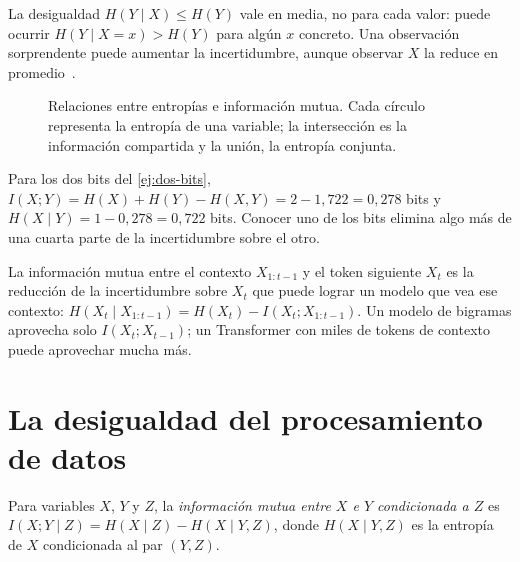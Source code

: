 \begin{observacion}
La desigualdad $H(Y\mid X)\le H(Y)$ vale en media, no para cada valor: puede ocurrir $H(Y\mid X=x)>H(Y)$ para algún $x$ concreto. Una observación sorprendente puede aumentar la incertidumbre, aunque observar $X$ la reduce en promedio~\cite[§2.6]{ct}.
\end{observacion}

\begin{figure}[h]
\centering
{}
\caption{Relaciones entre entropías e información mutua. Cada círculo representa la entropía de una variable; la intersección es la información compartida y la unión, la entropía conjunta.}
\label{fig:venn}
\end{figure}

\begin{ejemplo}\label{ej:mutua-bits}
Para los dos bits del \cref{ej:dos-bits}, $I(X;Y)=H(X)+H(Y)-H(X,Y)=2-1{,}722=0{,}278$ bits y $H(X\mid Y)=1-0{,}278=0{,}722$ bits. Conocer uno de los bits elimina algo más de una cuarta parte de la incertidumbre sobre el otro.
\end{ejemplo}

\begin{observacion}
La información mutua entre el contexto $X_{1:t-1}$ y el token siguiente $X_t$ es la reducción de la incertidumbre sobre $X_t$ que puede lograr un modelo que vea ese contexto: $H(X_t\mid X_{1:t-1})=H(X_t)-I(X_t;X_{1:t-1})$. Un modelo de bigramas aprovecha solo $I(X_t;X_{t-1})$; un Transformer con miles de tokens de contexto puede aprovechar mucha más.
\end{observacion}

\section{La desigualdad del procesamiento de datos}

\begin{definicion}
Para variables $X$, $Y$ y $Z$, la \emph{información mutua entre $X$ e $Y$ condicionada a $Z$} es $I(X;Y\mid Z)=H(X\mid Z)-H(X\mid Y,Z)$, donde $H(X\mid Y,Z)$ es la entropía de $X$ condicionada al par $(Y,Z)$.
\end{definicion}

